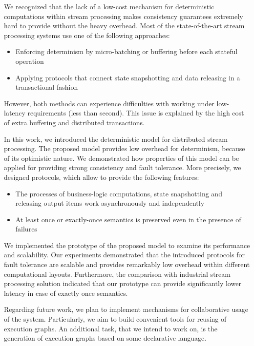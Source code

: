 
\label {fs-conclusion-seciton}

We recognized that the lack of a low-cost mechanism for deterministic computations within stream processing makes consistency guarantees extremely hard to provide without the heavy overhead. Most of the state-of-the-art stream processing systems use one of the following approaches: 
\begin{itemize}
    \item Enforcing determinism by micro-batching or buffering before each stateful operation
    \item Applying protocols that connect state snapshotting and data releasing in a transactional fashion
\end{itemize}

However, both methods can experience difficulties with working under low-latency requirements (less than second). This issue is explained by the high cost of extra buffering and distributed transactions.

In this work, we introduced the deterministic model for distributed stream processing. The proposed model provides low overhead for determinism, because of its optimistic nature. We demonstrated how properties of this model can be applied for providing strong consistency and fault tolerance. More precisely, we designed protocols, which allow to provide the following features:

\begin{itemize}
    \item The processes of business-logic computations, state snapshotting and releasing output items work asynchronously and independently
    \item At least once or exactly-once semantics is preserved even in the presence of failures
\end{itemize}

We implemented the prototype of the proposed model to examine its performance and scalability. Our experiments demonstrated that the introduced protocols for fault tolerance are scalable and provides remarkably low overhead within different computational layouts. Furthermore, the comparison with industrial stream processing solution indicated that our prototype can provide significantly lower latency in case of exactly once semantics.

Regarding future work, we plan to implement mechanisms for collaborative usage of the system. Particularly, we aim to build convenient tools for reusing of execution graphs. An additional task, that we intend to work on, is the generation of execution graphs based on some declarative language.